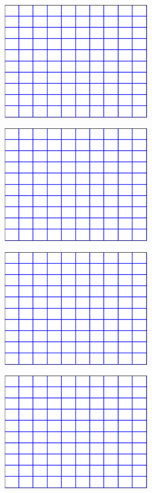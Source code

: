 \documentclass[11pt]{article}
\numberwithin{equation}{section}    %
\begin{document}
\newpage

\vspace{5in}
\pagestyle{empty}
\begin{figure}[h!]
\centering
\includegraphics[width=3in]{grid1}
\end{figure}

\newpage

\vspace{5in}
\pagestyle{empty}
\begin{figure}[h!]
\centering
\includegraphics[width=3in]{grid1}
\end{figure}


\newpage

\vspace{5in}
\pagestyle{empty}
\begin{figure}[h!]
\centering
\includegraphics[width=3in]{grid1}
\end{figure}

\newpage

\vspace{5in}
\pagestyle{empty}
\begin{figure}[h!]
\centering
\includegraphics[width=3in]{grid1}
\end{figure}
\end{document}

